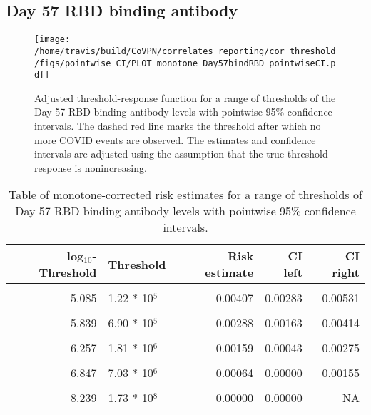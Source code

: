 \documentclass[]{book}
\theoremstyle{definition}
\theoremstyle{definition}
\theoremstyle{definition}
\newcommand{\1}{\mathbbm{1}}
\begin{document}
\clearpage

\clearpage

\clearpage

\hypertarget{day-57-rbd-binding-antibody-1}{%
\subsection{Day 57 RBD binding antibody}\label{day-57-rbd-binding-antibody-1}}

\begin{figure}[H]
\centering
\texttt{[image: /home/travis/build/CoVPN/correlates\_reporting/cor\_threshold/figs/pointwise\_CI/PLOT\_monotone\_Day57bindRBD\_pointwiseCI.pdf]}
\caption{Adjusted threshold-response function for a range of thresholds of the
  Day 57 RBD binding antibody levels with pointwise 95\% confidence intervals. The dashed red line marks the threshold after which no more COVID events are observed. The estimates and confidence intervals are adjusted using the assumption that the true threshold-response is nonincreasing.}
\end{figure}
\begin{table}[!h]

\caption{\label{tab:unnamed-chunk-365}Table of monotone-corrected risk estimates for a range of thresholds of Day 57 RBD binding antibody levels with pointwise 95\% confidence intervals.}
\centering
\begin{tabular}[t]{rlrrr}
\toprule
log$_{10}$-Threshold & Threshold & Risk estimate & CI left & CI right\\
\midrule
\cellcolor{gray!6}{4.062} & \cellcolor{gray!6}{1.15 * 10$^4$} & \cellcolor{gray!6}{0.00490} & \cellcolor{gray!6}{0.00360} & \cellcolor{gray!6}{0.00619}\\
5.085 & 1.22 * 10$^5$ & 0.00407 & 0.00283 & 0.00531\\
\cellcolor{gray!6}{5.507} & \cellcolor{gray!6}{3.21 * 10$^5$} & \cellcolor{gray!6}{0.00377} & \cellcolor{gray!6}{0.00247} & \cellcolor{gray!6}{0.00507}\\
5.839 & 6.90 * 10$^5$ & 0.00288 & 0.00163 & 0.00414\\
\cellcolor{gray!6}{6.048} & \cellcolor{gray!6}{1.12 * 10$^6$} & \cellcolor{gray!6}{0.00238} & \cellcolor{gray!6}{0.00113} & \cellcolor{gray!6}{0.00364}\\
6.257 & 1.81 * 10$^6$ & 0.00159 & 0.00043 & 0.00275\\
\cellcolor{gray!6}{6.499} & \cellcolor{gray!6}{3.16 * 10$^6$} & \cellcolor{gray!6}{0.00124} & \cellcolor{gray!6}{0.00001} & \cellcolor{gray!6}{0.00248}\\
6.847 & 7.03 * 10$^6$ & 0.00064 & 0.00000 & 0.00155\\
\cellcolor{gray!6}{7.181} & \cellcolor{gray!6}{1.52 * 10$^7$} & \cellcolor{gray!6}{0.00064} & \cellcolor{gray!6}{0.00000} & \cellcolor{gray!6}{0.00255}\\
8.239 & 1.73 * 10$^8$ & 0.00000 & 0.00000 & NA\\
\bottomrule
\end{tabular}
\end{table}
\end{document}
